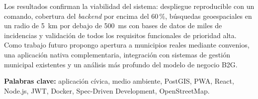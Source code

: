 Los resultados confirman la viabilidad del sistema: despliegue reproducible con un comando, cobertura del \textit{backend} por encima del 60\,\%, búsquedas geoespaciales en un radio de 5~km por debajo de 500~ms con bases de datos de miles de incidencias y validación de todos los requisitos funcionales de prioridad alta. Como trabajo futuro propongo apertura a municipios reales mediante convenios, una aplicación nativa complementaria, integración con sistemas de gestión municipal existentes y un análisis más profundo del modelo de negocio B2G.

\vspace{0.8cm}
\noindent\textbf{Palabras clave:} aplicación cívica, medio ambiente, PostGIS, PWA, React, Node.js, JWT, Docker, Spec-Driven Development, OpenStreetMap.
